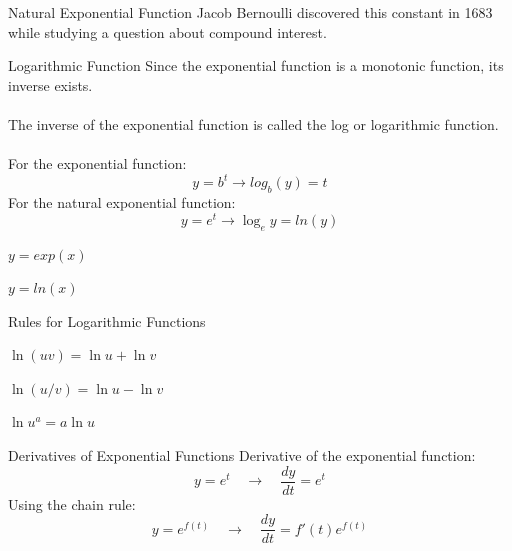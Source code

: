 \documentclass{./../../Latex/teaching_slides}
\begin{document}
\begin{frame}{Natural Exponential Function}
Jacob Bernoulli discovered this constant in 1683 while studying a question about compound interest.
\end{frame}

\begin{frame}{Logarithmic Function}
Since the exponential function is a monotonic function, its inverse exists. \\~\\
The inverse of the exponential function is called the log or logarithmic function. \\~\\
For the exponential function: 
\[ y=b^{t} \rightarrow log_b(y) = t  \]
For the natural exponential function:
\[y=e^{t} \rightarrow \log _{e} y =ln(y) \]
\end{frame}


\pgfplotsset{%
    width=10cm,
    height=8cm
}

\begin{frame}{$y=exp(x)$}
\centering
{} 
\end{frame}

\begin{frame}{$y=ln(x)$}
\centering
{} 
\end{frame}


\begin{frame}{Rules for Logarithmic Functions}
\begin{witemize}
	\item $\ln (u v)=\ln u+\ln v$
	\item $\ln (u / v)=\ln u-\ln v$
	\item $\ln u^{a}=a \ln u$
\end{witemize}
\end{frame}

\begin{frame}{Derivatives of Exponential Functions}
Derivative of the exponential function:
 $$y=e^{t} \quad \rightarrow \quad \frac{dy}{dt} = e^t$$
Using the chain rule: 
 $$y=e^{f(t)} \quad \rightarrow \quad \frac{dy}{dt} = f'(t) e^{f(t)}$$
 \end{frame}
\end{document}
